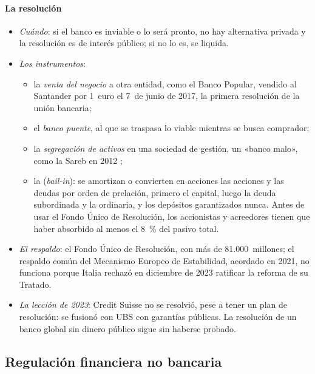 \documentclass[11pt]{article}
\begin{document}
\paragraph{La resolución}

\begin{itemize}
\item \emph{Cuándo}: si el banco es inviable o lo será pronto, no hay alternativa privada y la resolución es de interés público; si no lo es, se liquida.
\item \emph{Los instrumentos}:
  \begin{itemize}
  \item la \emph{venta del negocio} a otra entidad, como el Banco Popular, vendido al Santander por 1~euro el 7~de junio de 2017, la primera resolución de la unión bancaria;
  \item el \emph{banco puente}, al que se traspasa lo viable mientras se busca comprador;
  \item la \emph{segregación de activos} en una sociedad de gestión, un «banco malo», como la Sareb en 2012 ;
  \item la  (\emph{bail-in}): se amortizan o convierten en acciones las acciones y las deudas por orden de prelación, primero el capital, luego la deuda subordinada y la ordinaria, y los depósitos garantizados nunca. Antes de usar el Fondo Único de Resolución, los accionistas y acreedores tienen que haber absorbido al menos el 8~\% del pasivo total.
  \end{itemize}
\item \emph{El respaldo}: el Fondo Único de Resolución, con más de 81.000~millones; el respaldo común del Mecanismo Europeo de Estabilidad, acordado en 2021, no funciona porque Italia rechazó en diciembre de 2023 ratificar la reforma de su Tratado\nocite{SRB2026FUR,MEDE2026InformeAnual}.
\item \emph{La lección de 2023}: Credit Suisse no se resolvió, pese a tener un plan de resolución: se fusionó con UBS con garantías públicas. La resolución de un banco global sin dinero público sigue sin haberse probado.
\end{itemize}

\subsection{Regulación financiera no bancaria}\label{sec:no-bancaria}
\end{document}
